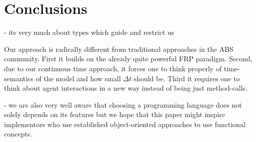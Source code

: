 \section{Conclusions}
- its very much about types which guide and restrict us

Our approach is radically different from traditional approaches in the ABS community. First it builds on the already quite powerful FRP paradigm. Second, due to our continuous time approach, it forces one to think properly of time-semantics of the model and how small $\Delta t$ should be. Third it requires one to think about agent interactions in a new way instead of being just method-calls.

- we are also very well aware that choosing a programming language does not solely depends on its features but we hope that this paper might inspire implementors who use established object-oriented approaches to use functional concepts.